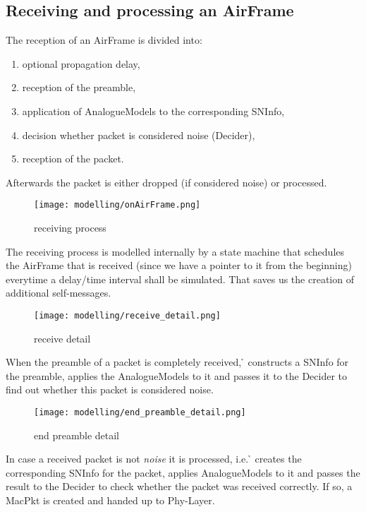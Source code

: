 \subsection{Receiving and processing an AirFrame}

The reception of an AirFrame is divided into:
\begin{enumerate}
	
	\item optional propagation delay,
	\item reception of the preamble,
	\item application of AnalogueModels to the corresponding SNInfo,
	\item decision whether packet is considered noise (Decider),
	\item reception of the packet.
\end{enumerate}

Afterwards the packet is either dropped (if considered noise) or processed. 

\begin{figure}[H]
 \centering
 \texttt{[image: modelling/onAirFrame.png]}
 \caption{receiving process}
 \label{fig: receiving process}
\end{figure}

The receiving process is modelled internally by a state machine that schedules the AirFrame that is received (since we have a pointer to it from the beginning) everytime a delay/time interval shall be simulated. That saves us the creation of additional self-messages.


\begin{figure}[H]
 \centering
 \texttt{[image: modelling/receive\_detail.png]}
 \caption{receive detail}
 \label{fig: receive detail}
\end{figure}

When the preamble of a packet is completely received, \h{\bp} constructs a SNInfo for the preamble, applies the AnalogueModels to it and passes it to the Decider to find out whether this packet is considered noise.

\begin{figure}[H]
 \centering
 \texttt{[image: modelling/end\_preamble\_detail.png]}
 \caption{end preamble detail}
 \label{fig: end preamble detail}
\end{figure}

In case a received packet is not \textit{noise} it is processed, i.e. \h{\bp} creates the corresponding SNInfo for the packet, applies AnalogueModels to it and passes the result to the Decider to check whether the packet was received correctly. If so, a MacPkt is created and handed up to Phy-Layer.


